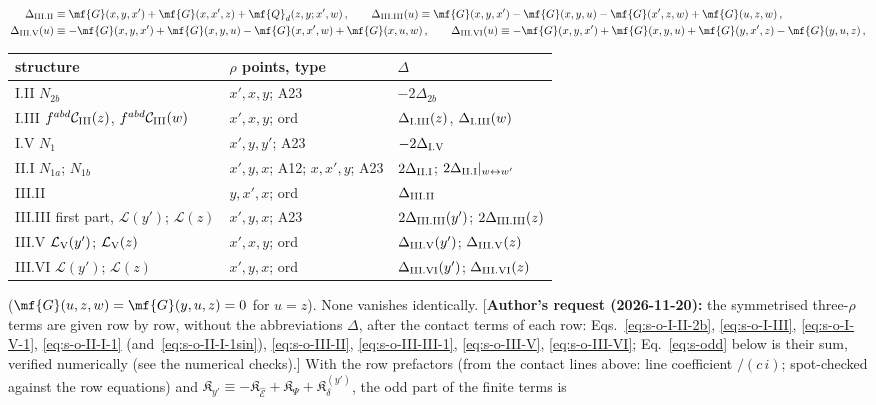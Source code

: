{\begin{align}
\Delta_{\rm III.II}&\equiv\mf{G}(x,y,x')+\mf{G}(x,x',z)+\mf{Q}_{d}(z,y;x',w)\,,\qquad
\Delta_{\rm III.III}(u)\equiv\mf{G}(x,y,x')-\mf{G}(x,y,u)-\mf{G}(x',z,w)+\mf{G}(u,z,w)\,,\notag\\
\Delta_{\rm III.V}(u)&\equiv-\mf{G}(x,y,x')+\mf{G}(x,y,u)-\mf{G}(x,x',w)+\mf{G}(x,u,w)\,,\qquad
\Delta_{\rm III.VI}(u)\equiv-\mf{G}(x,y,x')+\mf{G}(x,y,u)+\mf{G}(y,x',z)-\mf{G}(y,u,z)\,,\label{eq:s-Deltas}
\end{align}
\begin{center}\small\renewcommand{\arraystretch}{1.25}
\begin{tabular}{|l|l|l|}\hline
structure & $\rho$ points, type & $\Delta$\\\hline
I.II $N_{2b}$ & $x',x,y$; A23 & $-2\Delta_{2b}$\\
I.III $f^{abd}\mathcal{C}_{\rm III}(z)$, $f^{abd}\mathcal{C}_{\rm III}(w)$ & $x',x,y$; ord & $\Delta_{\rm I.III}(z)$, $\Delta_{\rm I.III}(w)$\\
I.V $N_{1}$ & $x',y,y'$; A23 & $-2\Delta_{\rm I.V}$\\
II.I $N_{1a}$; $N_{1b}$ & $x',y,x$; A12; $x,x',y$; A23 & $2\Delta_{\rm II.I}$; $2\Delta_{\rm II.I}|_{w\leftrightarrow w'}$\\
III.II & $y,x',x$; ord & $\Delta_{\rm III.II}$\\
III.III first part, $\mathcal{L}(y')$; $\mathcal{L}(z)$ & $x',y,x$; A23 & $2\Delta_{\rm III.III}(y')$; $2\Delta_{\rm III.III}(z)$\\
III.V $\mathcal{L}_{\rm V}(y')$; $\mathcal{L}_{\rm V}(z)$ & $x',x,y$; ord & $\Delta_{\rm III.V}(y')$; $\Delta_{\rm III.V}(z)$\\
III.VI $\mathcal{L}(y')$; $\mathcal{L}(z)$ & $x',y,x$; ord & $\Delta_{\rm III.VI}(y')$; $\Delta_{\rm III.VI}(z)$\\\hline
\end{tabular}\end{center}
($\mf{G}(u,z,w)=\mf{G}(y,u,z)=0$ for $u=z$). None vanishes identically. [\textbf{Author's request (2026-11-20):} the symmetrised three-$\rho$ terms are given row by row, without the abbreviations $\Delta$, after the contact terms of each row: Eqs.~\eqref{eq:s-o-I-II-2b}, \eqref{eq:s-o-I-III}, \eqref{eq:s-o-I-V-1}, \eqref{eq:s-o-II-I-1} (and~\eqref{eq:s-o-II-I-1sin}), \eqref{eq:s-o-III-II}, \eqref{eq:s-o-III-III-1}, \eqref{eq:s-o-III-V}, \eqref{eq:s-o-III-VI}; Eq.~\eqref{eq:s-odd} below is their sum, verified numerically (see the numerical checks).] With the row prefactors (from the contact lines above: line coefficient $/(c\,i)$; spot-checked against the row equations) and $\mathfrak{K}_{y'}\equiv-\mathfrak{K}_{\widehat{\mathcal{E}}}+\mathfrak{K}_{\Psi}+\mathfrak{K}^{(y')}_{\delta}$, the odd part of the finite terms is
}
